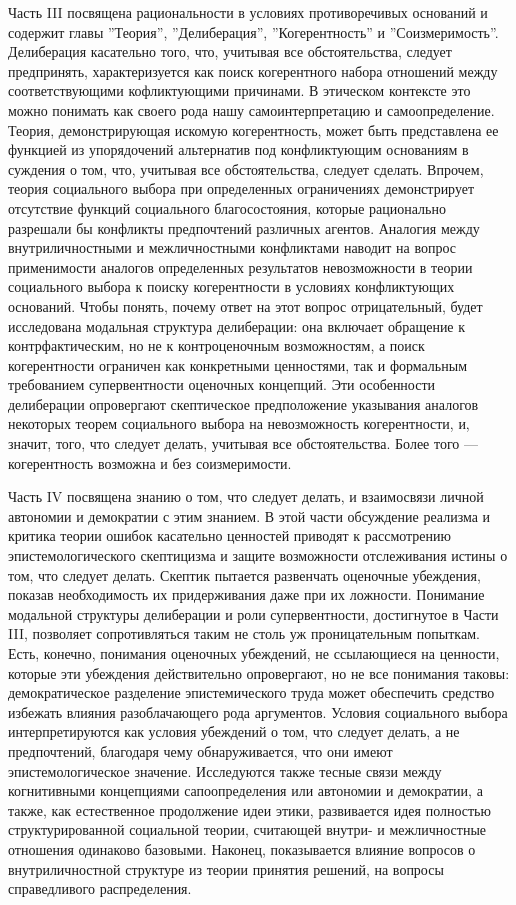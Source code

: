 \documentclass[11pt]{book}
\begin{document}
Часть III посвящена рациональности в условиях противоречивых оснований и содержит главы ''Теория'', ''Делиберация'', ''Когерентность'' и ''Соизмеримость''. Делиберация касательно того, что, учитывая все обстоятельства, следует предпринять, характеризуется как поиск когерентного набора отношений между соответствующими кофликтующими причинами. В этическом контексте это можно понимать как своего рода нашу самоинтерпретацию и самоопределение. Теория, демонстрирующая искомую когерентность, может быть представлена ее функцией из упорядочений альтернатив под конфликтующим основаниям в суждения о том, что, учитывая все обстоятельства, следует сделать. Впрочем, теория социального выбора при определенных ограничениях демонстрирует отсутствие функций социального благосостояния, которые рационально разрешали бы конфликты предпочтений различных агентов. Аналогия между внутриличностными и межличностными конфликтами наводит на вопрос применимости аналогов определенных результатов невозможности в теории социального выбора к поиску когерентности в условиях конфликтующих оснований. Чтобы понять, почему ответ на этот вопрос отрицательный, будет исследована модальная структура делиберации: она включает обращение к контрфактическим, но не к контроценочным возможностям, а поиск когерентности ограничен как конкретными ценностями, так и формальным требованием супервентности оценочных концепций. Эти особенности делиберации опровергают скептическое предположение указывания аналогов некоторых теорем социального выбора на невозможность когерентности, и, значит, того, что следует делать, учитывая все обстоятельства. Более того --- когерентность возможна и без соизмеримости.

Часть IV посвящена знанию о том, что следует делать, и взаимосвязи личной автономии и демократии с этим знанием. В этой части обсуждение реализма и критика теории ошибок касательно ценностей приводят к рассмотрению эпистемологического скептицизма и защите возможности отслеживания истины о том, что следует делать. Скептик пытается развенчать оценочные убеждения, показав необходимость их придерживания даже при их ложности. Понимание модальной структуры делиберации и роли супервентности, достигнутое в Части III, позволяет сопротивляться таким не столь уж проницательным попыткам. Есть, конечно, понимания оценочных убеждений, не ссылающиеся на ценности, которые эти убеждения действительно опровергают, но не все понимания таковы: демократическое разделение эпистемического труда может обеспечить средство избежать влияния разоблачающего рода аргументов. Условия социального выбора интерпретируются как условия убеждений о том, что следует делать, а не предпочтений, благодаря чему обнаруживается, что они имеют эпистемологическое значение. Исследуются также тесные связи между когнитивными концепциями сапоопределения или автономии и демократии, а также, как естественное продолжение идеи этики, развивается идея полностью структурированной социальной теории, считающей внутри- и межличностные отношения одинаково базовыми. Наконец, показывается влияние вопросов о внутриличностной структуре из теории принятия решений, на вопросы справедливого распределения.
\end{document}
